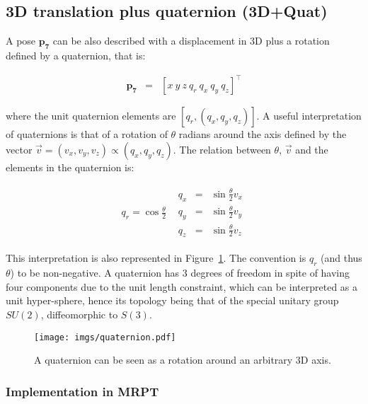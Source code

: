 \documentclass[a4paper,11pt]{report}
\begin{document}

\subsection{3D translation plus quaternion (3D+Quat)}

A pose $\mathbf{p_7}$ can be also described with a displacement in 3D plus a rotation
defined by a quaternion, that is:

\begin{eqnarray}
\mathbf{p_7} &=& [x ~ y ~ z ~  q_r ~ q_x ~ q_y ~ q_z ] ^ \top
\end{eqnarray}

\noindent where the unit quaternion elements are $[q_r, (q_x,q_y,q_z)]$. A useful interpretation of quaternions
is that of a rotation of $\theta$ radians around the axis defined by the vector $\vec{v} = (v_x,v_y,v_z) \propto (q_x,q_y,q_z)$.
The relation between $\theta$, $\vec{v}$ and the elements in the quaternion is:

\begin{equation*}
\begin{array}{cc}
q_r = \cos\frac{\theta}{2}  &
  \begin{array}{rcl}
    q_x &=& \sin\frac{\theta}{2} v_x  \\
    q_y &=& \sin\frac{\theta}{2} v_y  \\
    q_z &=& \sin\frac{\theta}{2} v_z
  \end{array}
\end{array}
\end{equation*}

This interpretation is also represented in Figure~\ref{fig:quat}.
The convention is $q_r$ (and thus $\theta$) to be non-negative.
A quaternion has 3 degrees of freedom in spite of having four components
due to the unit length constraint, which can be interpreted as a unit hyper-sphere, 
hence its topology being that of the special unitary group $SU(2)$, diffeomorphic to $S(3)$.


\begin{figure}[h]
\centering
\texttt{[image: imgs/quaternion.pdf]}
\caption{A quaternion can be seen as a rotation around an arbitrary 3D axis.}
\label{fig:quat}
\end{figure}


\subsubsection{Implementation in MRPT}
\end{document}
